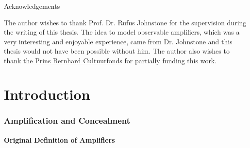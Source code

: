 \documentclass[a4paper,12pt]{article}
\numberwithin{equation}{section}
\begin{document}
\vspace{1cm}

\begin{center}
\begin{minipage}[t]{0.8\textwidth}
\begin{bf}
Acknowledgements
\end{bf}
\vspace{.2cm}
\newline
The author wishes to thank Prof. Dr. Rufus Johnstone for the supervision during the writing of this thesis. The idea to model observable amplifiers, which was a very interesting and enjoyable experience, came from Dr. Johnstone and this thesis would not have been possible without him. The author also wishes to thank the \href{http://www.cultuurfonds.nl}{Prins Bernhard Cultuurfonds} for partially funding this work.
\end{minipage}
\end{center}

\newpage\clearpage


\label{sec:Contents}
\renewcommand{\contentsname}{Contents\\} 

\tableofcontents

\newpage\clearpage


\part{Introduction}
\label{sec:Introduction}

\newpage\clearpage


\section{Amplification and Concealment}
\label{sec:Introduction/Amplification and Concealment}
\subsection{Original Definition of Amplifiers}
\label{sec:Original Definition of Amplifiers}
\end{document}
